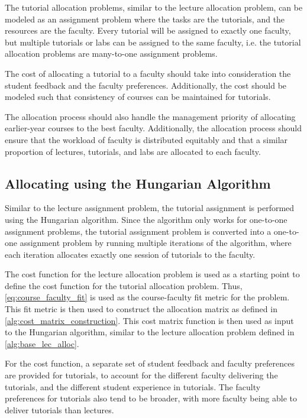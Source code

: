 The tutorial allocation problems, similar to the lecture allocation problem, can be modeled as an assignment problem where the tasks are the tutorials, and the resources are the faculty. Every tutorial will be assigned to exactly one faculty, but multiple tutorials or labs can be assigned to the same faculty, i.e. the tutorial allocation problems are many-to-one assignment problems.

The cost of allocating a tutorial to a faculty should take into consideration the student feedback and the faculty preferences. Additionally, the cost should be modeled such that consistency of courses can be maintained for tutorials.

The allocation process should also handle the management priority of allocating earlier-year courses to the best faculty. Additionally, the allocation process should ensure that the workload of faculty is distributed equitably and that a similar proportion of lectures, tutorials, and labs are allocated to each faculty.

\subsection{Allocating using the Hungarian Algorithm}

Similar to the lecture assignment problem, the tutorial assignment is performed using the Hungarian algorithm. Since the algorithm only works for one-to-one assignment problems, the tutorial assignment problem is converted into a one-to-one assignment problem by running multiple iterations of the algorithm, where each iteration allocates exactly one session of tutorials to the faculty.

The cost function for the lecture allocation problem is used as a starting point to define the cost function for the tutorial allocation problem. Thus, \autoref{eq:course_faculty_fit} is used as the course-faculty fit metric for the problem. This fit metric is then used to construct the allocation matrix as defined in \autoref{alg:cost_matrix_construction}. This cost matrix function is then used as input to the Hungarian algorithm, similar to the lecture allocation problem defined in \autoref{alg:base_lec_alloc}.

For the cost function, a separate set of student feedback and faculty preferences are provided for tutorials, to account for the different faculty delivering the tutorials, and the different student experience in tutorials. The faculty preferences for tutorials also tend to be broader, with more faculty being able to deliver tutorials than lectures.

